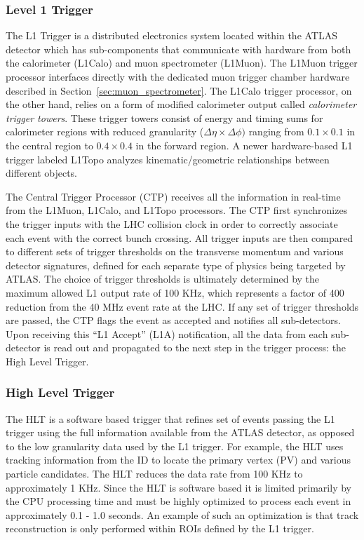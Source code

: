 \subsubsection{Level 1 Trigger}
The L1 Trigger is a distributed electronics system located within the ATLAS detector which has sub-components that communicate with hardware from both the calorimeter (L1Calo) and muon spectrometer (L1Muon).
The L1Muon trigger processor interfaces directly with the dedicated muon trigger chamber hardware described in Section~\ref{sec:muon_spectrometer}.
The L1Calo trigger processor, on the other hand, relies on a form of modified calorimeter output called \textit{calorimeter trigger towers}.
These trigger towers consist of energy and timing sums for calorimeter regions with reduced granularity ($\Delta \eta \times \Delta \phi)$ ranging from $0.1 \times 0.1$ in the central region to $0.4 \times 0.4$ in the forward region.
A newer hardware-based L1 trigger labeled L1Topo analyzes kinematic/geometric relationships between different objects.

The Central Trigger Processor (CTP) receives all the information in real-time from the L1Muon, L1Calo, and L1Topo processors.
The CTP first synchronizes the trigger inputs with the LHC collision clock in order to correctly associate each event with the correct bunch crossing.
All trigger inputs are then compared to different sets of trigger thresholds on the transverse momentum and various detector signatures, defined for each separate type of physics being targeted by ATLAS.
The choice of trigger thresholds is ultimately determined by the maximum allowed L1 output rate of 100 KHz, which represents a factor of 400 reduction from the 40 MHz event rate at the LHC.
If any set of trigger thresholds are passed, the CTP flags the event as accepted and notifies all sub-detectors.
Upon receiving this ``L1 Accept'' (L1A) notification, all the data from each sub-detector is read out and propagated to the next step in the trigger process: the High Level Trigger.

\subsubsection{High Level Trigger}
The HLT is a software based trigger that refines set of events passing the L1 trigger using the full information available from the ATLAS detector, as opposed to the low granularity data used by the L1 trigger.
For example, the HLT uses tracking information from the ID to locate the primary vertex (PV)  and various particle candidates.
The HLT reduces the data rate from 100 KHz to approximately 1 KHz.
Since the HLT is software based it is limited primarily by the CPU processing time and must be highly optimized to process each event in approximately 0.1 - 1.0 seconds.
An example of such an optimization is that track reconstruction  is only performed within ROIs defined by the L1 trigger.


